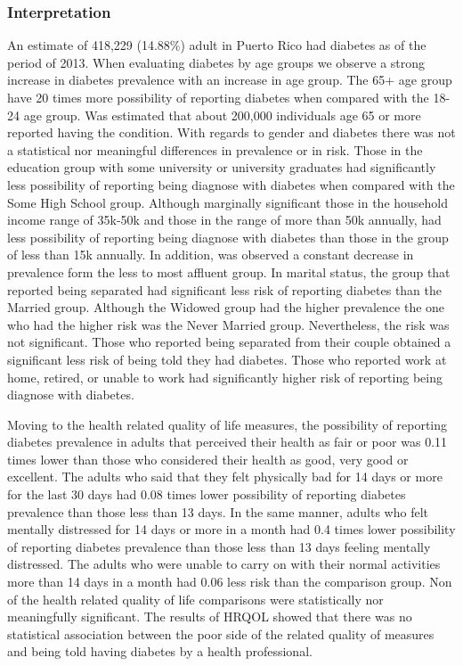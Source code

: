 \newpage
 \subsubsection{Interpretation}

An estimate of 418,229 
(14.88\%) adult in Puerto Rico had diabetes as of the period of 2013.
When evaluating diabetes by age groups we observe a strong increase in diabetes prevalence with an increase in age group. The 65+ age group have 20 times more possibility of reporting diabetes when compared with the 18-24 age group. Was estimated that about 200,000 individuals age 65 or more reported having the condition. With regards to gender and diabetes there was not a statistical nor meaningful differences in prevalence or in risk.  Those in the education group with some university or university graduates had significantly less possibility of reporting being diagnose with diabetes when compared with the Some High School group.  Although marginally significant those in the household income range of 35k-50k and those in the range of more than 50k annually, had less possibility of reporting being diagnose with diabetes than those in the group of less than 15k annually. In addition, was observed a constant decrease in prevalence form the less to most affluent group. In marital status, the group that reported being separated had significant less risk of reporting diabetes than the Married group. Although the Widowed group had the higher prevalence the one who had the higher risk was the Never Married group. Nevertheless, the risk was not significant.  Those who reported being separated from their couple obtained a significant less risk of being told they had diabetes. Those who reported work at home, retired, or unable to work had significantly higher risk of reporting being diagnose with diabetes.

Moving to the health related quality of life measures, the possibility of reporting diabetes prevalence in adults that perceived their health as fair or poor was 0.11 times lower than those who considered their health as good, very good or excellent. The adults who said that they felt physically bad for 14 days or more for the last 30 days had 0.08 times lower possibility of reporting diabetes prevalence than those less than 13 days. In the same manner, adults who felt mentally distressed for 14 days or more in a month had 0.4 times lower possibility of reporting diabetes prevalence than those less than 13 days feeling mentally distressed. The adults who were unable to carry on with their normal activities more than 14 days in a month had 0.06 less risk than the comparison group. Non of the health related quality of life comparisons were statistically nor meaningfully significant. The results of HRQOL showed that there was no statistical association between the poor side of the related quality of measures and being told having diabetes by a health professional.

